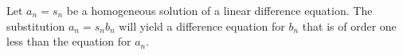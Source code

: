 \begin{Result} 
  Let $a_n = s_n$ be a homogeneous solution of a linear difference equation. 
  The substitution $a_n = s_n b_n$ will yield a difference equation for $b_n$ 
  that is of order one less than the equation for $a_n$. 
\end{Result} 




